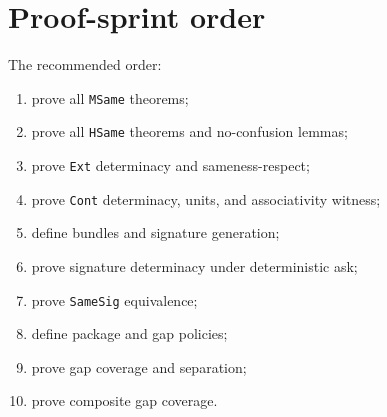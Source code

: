 \section{Proof-sprint order}

The recommended order:
\begin{enumerate}
\item prove all \texttt{MSame} theorems;
\item prove all \texttt{HSame} theorems and no-confusion lemmas;
\item prove \texttt{Ext} determinacy and sameness-respect;
\item prove \texttt{Cont} determinacy, units, and associativity witness;
\item define bundles and signature generation;
\item prove signature determinacy under deterministic ask;
\item prove \texttt{SameSig} equivalence;
\item define package and gap policies;
\item prove gap coverage and separation;
\item prove composite gap coverage.
\end{enumerate}
